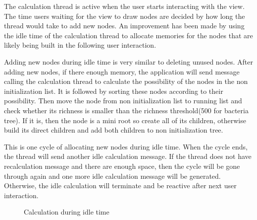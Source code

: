 \documentclass[MSc]{icldt}
\begin{document}
The calculation thread is active when the user starts interacting with the view. The time users waiting for the view to draw nodes are decided by how long the thread would take to add new nodes. An improvement has been made by using the idle time of the calculation thread to allocate memories for the nodes that are likely being built in the following user interaction. 

Adding new nodes during idle time is very similar to deleting unused nodes. After adding new nodes, if there enough memory, the application will send message calling the calculation thread to calculate the possibility of the nodes in the non initialization list. It is followed by sorting these nodes according to their possibility. Then move the node from non initialization list to running list and check whether its richness is smaller than the richness threshold(500 for bacteria tree). If it is, then the node is a mini root so create all of its children, otherwise build its direct children and add both children to non initialization tree. 

This is one cycle of allocating new nodes during idle time. When the cycle ends, the thread will send another idle calculation message. If the thread does not have recalculation message and there are enough space, then the cycle will be gone through again and one more idle calculation message will be generated. Otherwise, the idle calculation will terminate and be reactive after next user interaction.

 \begin{figure}[H]
\caption{Calculation during idle time}
 \end{figure}
\end{document}
